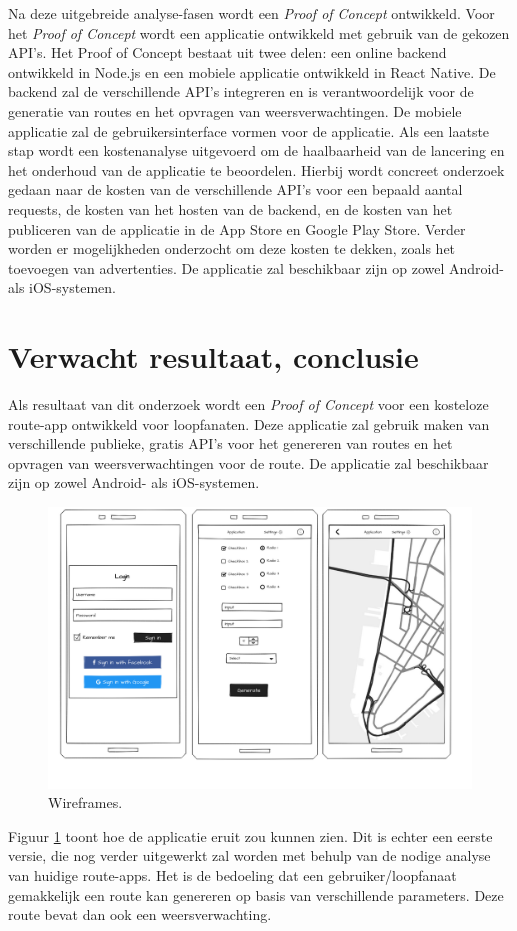 Na deze uitgebreide analyse-fasen wordt een \emph{Proof of Concept} ontwikkeld.
Voor het \emph{Proof of Concept} wordt een applicatie ontwikkeld met gebruik van de gekozen API's.
Het Proof of Concept bestaat uit twee delen: een online backend ontwikkeld in Node.js
en een mobiele applicatie ontwikkeld in React Native. 
De backend zal de verschillende API's integreren en is verantwoordelijk voor 
de generatie van routes en het opvragen van weersverwachtingen.
De mobiele applicatie zal de gebruikersinterface vormen voor de applicatie.
Als een laatste stap wordt een kostenanalyse uitgevoerd om de haalbaarheid van de lancering en het onderhoud van de applicatie te beoordelen.
Hierbij wordt concreet onderzoek gedaan naar de kosten van de verschillende API's voor een bepaald aantal requests, 
de kosten van het hosten van de backend, en de kosten van het publiceren van de applicatie in de App Store en Google Play Store.
Verder worden er mogelijkheden onderzocht om deze kosten te dekken, zoals het toevoegen van advertenties.
De applicatie zal beschikbaar zijn op zowel Android- als iOS-systemen.

\section{Verwacht resultaat, conclusie}%
\label{sec:verwachte_resultaten}

Als resultaat van dit onderzoek wordt een \emph{Proof of Concept}
voor een kosteloze route-app ontwikkeld voor loopfanaten.
Deze applicatie zal gebruik maken van verschillende publieke, gratis API's voor het
genereren van routes en het opvragen van weersverwachtingen voor de route.
De applicatie zal beschikbaar zijn op zowel Android- als iOS-systemen.


\begin{figure}[h!]
    \includegraphics[width=\linewidth]{./graphics/wireframes.png}
    \caption{Wireframes.}
    \label{fig:wireframes}
\end{figure}

Figuur \ref{fig:wireframes} toont hoe de applicatie eruit zou kunnen zien. 
Dit is echter een eerste versie,
die nog verder uitgewerkt zal worden met behulp van de nodige analyse van huidige route-apps.
Het is de bedoeling dat een gebruiker/loopfanaat gemakkelijk een route kan genereren op basis van verschillende parameters. Deze route bevat dan ook een weersverwachting. 